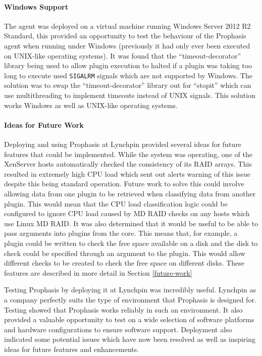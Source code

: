 \documentclass[bsc,logo,twoside,parskip,singlespacing,notimes]{infthesis}
\begin{document}
\paragraph*{Windows Support}
	The agent was deployed on a virtual machine running Windows Server 2012 R2
	Standard, this provided an opportunity to test the behaviour of the Prophasis
	agent when running under Windows (previously it had only ever been executed on
	UNIX-like operating systems).  It was found that the ``timeout-decorator''
	library being used to allow plugin execution to halted if a plugin was taking
	too long to execute used \texttt{SIGALRM} signals which are not supported by
	Windows. The solution was to swap the ``timeout-decorator'' library out for
	``stopit'' which can use multithreading to implement timeouts instead of UNIX
	signals.  This solution works Windows as well as UNIX-like operating systems.

\paragraph*{Ideas for Future Work}
	Deploying and using Prophasis at Lynchpin provided several ideas for future
	features that could be implemented.  While the system
	was operating, one of the XenServer hosts automatically checked the consistency of
	its RAID arrays.  This resulted in extremely high CPU load which sent out
	alerts warning of this issue despite this being standard operation. Future work
	to solve this could involve allowing data from one plugin to be retrieved when
	classifying data from another plugin. This would mean that the CPU load
	classification logic could be configured to ignore CPU load caused by MD RAID
	checks on any hosts which use Linux MD RAID. It was also determined that it
	would be useful to be able to pass arguments into plugins from the core.  This
	means that, for example, a plugin could be written to check the free space
	available on a disk and the disk to check could be specified through an
	argument to the plugin. This would allow different checks to be created to
	check the free space on different disks.  These features are described in more
	detail in Section \ref{future-work}


	Testing Prophasis by deploying it at Lynchpin was incredibly useful. Lynchpin
	as a company perfectly suits the type of environment that Prophasis is designed
	for. Testing showed that Prophasis works reliably in such an environment.  It also
	provided a valuable opportunity to test on a wide selection of software
	platforms and hardware configurations to ensure software support.  Deployment
	also indicated some potential issues which have now been resolved as well as
	inspiring ideas for future features and enhancements.
\end{document}
